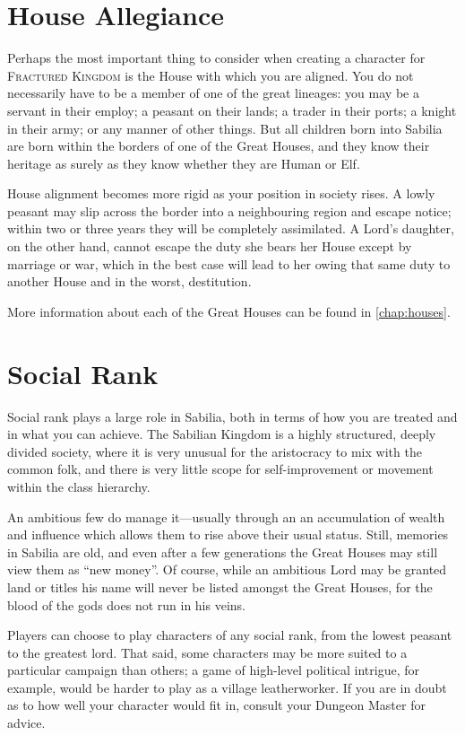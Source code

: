 \documentclass[10pt,twoside,openright,a4paper,twocolumn]{book}
\begin{document}
\section{House Allegiance}

Perhaps the most important thing to consider when creating a character for
\textsc{Fractured Kingdom} is the House with which you are aligned.  You do not
necessarily have to be a member of one of the great lineages: you may be a
servant in their employ; a peasant on their lands; a trader in their ports; a
knight in their army; or any manner of other things.  But all children born
into Sabilia are born within the borders of one of the Great Houses, and they
know their heritage as surely as they know whether they are Human or Elf.

House alignment becomes more rigid as your position in society rises.  A lowly
peasant may slip across the border into a neighbouring region and escape
notice; within two or three years they will be completely assimilated.  A
Lord's daughter, on the other hand, cannot escape the duty she bears her House
except by marriage or war, which in the best case will lead to her owing that
same duty to another House and in the worst, destitution.

More information about each of the Great Houses can be found in
\autoref{chap:houses}.

\section{Social Rank}

Social rank plays a large role in Sabilia, both in terms of how you are treated
and in what you can achieve.  The Sabilian Kingdom is a highly structured,
deeply divided society, where it is very unusual for the aristocracy to mix
with the common folk, and there is very little scope for self-improvement or
movement within the class hierarchy.

An ambitious few do manage it---usually through an an accumulation of wealth
and influence which allows them to rise above their usual status.  Still,
memories in Sabilia are old, and even after a few generations the Great Houses
may still view them as ``new money''.  Of course, while an ambitious Lord may
be granted land or titles his name will never be listed amongst the Great
Houses, for the blood of the gods does not run in his veins.

Players can choose to play characters of any social rank, from the lowest
peasant to the greatest lord.  That said, some characters may be more suited
to a particular campaign than others; a game of high-level political intrigue,
for example, would be harder to play as a village leatherworker.  If you are
in doubt as to how well your character would fit in, consult your Dungeon
Master for advice.
\end{document}
